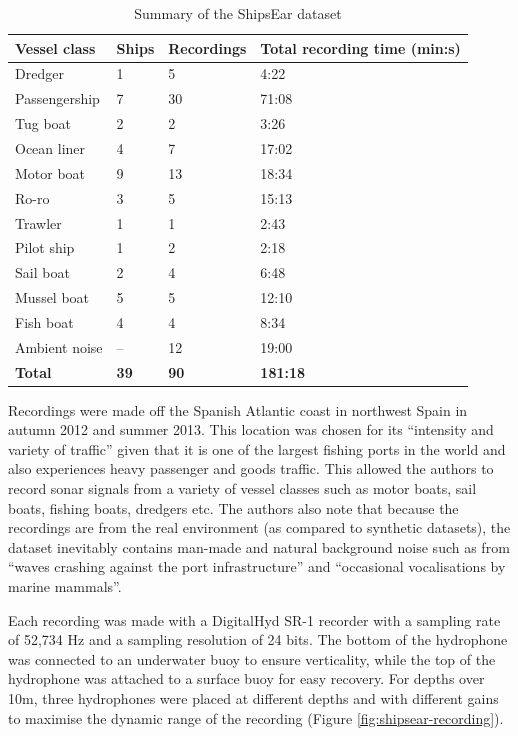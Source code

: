 \begin{table}[tbp]
\centering
\caption{Summary of the ShipsEar dataset}
\label{tab:shipsear-summary}
\begin{tabular}{llll}
\toprule
\textbf{Vessel class} & \textbf{Ships} & \textbf{Recordings} & \textbf{Total recording time (min:s)} \\ \midrule
Dredger       & 1  & 5   & 4:22  \\
Passengership & 7  & 30  & 71:08 \\
Tug boat      & 2  & 2   & 3:26  \\
Ocean liner   & 4  & 7   & 17:02 \\
Motor boat    & 9  & 13  & 18:34 \\
Ro-ro         & 3  & 5   & 15:13 \\
Trawler       & 1  & 1   & 2:43  \\
Pilot ship    & 1  & 2   & 2:18  \\
Sail boat     & 2  & 4   & 6:48  \\
Mussel boat   & 5  & 5   & 12:10 \\
Fish boat     & 4  & 4   & 8:34  \\
Ambient noise & –  & 12  & 19:00 \\ 
\textbf{Total}& \textbf{39} & \textbf{90} & \textbf{181:18} \\ \bottomrule
\end{tabular}
\end{table}

Recordings were made off the Spanish Atlantic coast in northwest Spain in autumn 2012 and summer 2013. This location was chosen for its ``intensity and variety of traffic'' given that it is one of the largest fishing ports in the world and also experiences heavy passenger and goods traffic. This allowed the authors to record sonar signals from a variety of vessel classes such as motor boats, sail boats, fishing boats, dredgers etc. The authors also note that because the recordings are from the real environment (as compared to synthetic datasets), the dataset inevitably contains man-made and natural background noise such as from ``waves crashing against the port infrastructure'' and ``occasional vocalisations by marine mammals''.

Each recording was made with a DigitalHyd SR-1 recorder with a sampling rate of 52,734 Hz and a sampling resolution of 24 bits. The bottom of the hydrophone was connected to an underwater buoy to ensure verticality, while the top of the hydrophone was attached to a surface buoy for easy recovery. For depths over 10m, three hydrophones were placed at different depths and with different gains to maximise the dynamic range of the recording (Figure \ref{fig:shipsear-recording}). 

